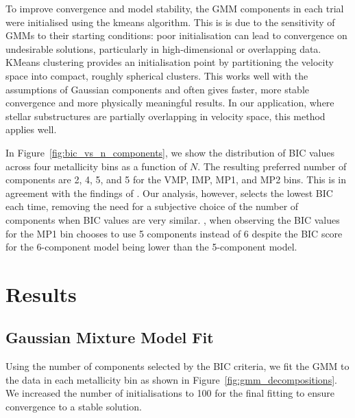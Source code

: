 \documentclass[a4paper,12pt]{article}
\begin{document}
To improve convergence and model stability, the GMM components in each trial were initialised using the kmeans algorithm. 
This is is due to the sensitivity of GMMs to their starting conditions: poor initialisation can lead to convergence 
on undesirable solutions, particularly in high-dimensional or overlapping data. KMeans clustering provides an
initialisation point by partitioning the velocity space into compact, roughly spherical clusters. This works well with the 
assumptions of Gaussian components and often gives faster, more stable convergence and more physically meaningful results. 
In our application, where stellar substructures are partially overlapping in velocity space, this method applies well.

In Figure~\ref{fig:bic_vs_n_components}, we show the distribution of BIC values across four metallicity bins as
a function of $N$. The resulting preferred number of components are 2, 4, 5, and 5 for the VMP, IMP, MP1, and MP2 bins.
This is in agreement with the findings of \citet{zhang2024existencemetalpoordiscmilky}.
Our analysis, however, selects the lowest BIC each time, removing the need for a subjective choice of the number of components
when BIC values are very similar. \citet{zhang2024existencemetalpoordiscmilky}, when observing the BIC values for the MP1 bin 
chooses to use 5 components instead of 6 despite the BIC score for the 6-component model being lower than the 5-component model.

 
\section{Results}
\label{sec:results1}

\subsection{Gaussian Mixture Model Fit}
\label{subsec:gmm}

Using the number of components selected by the BIC criteria, we fit the GMM to the data in each metallicity bin as shown in 
Figure~\ref{fig:gmm_decompositions}. We increased the number of initialisations to 100 for the final fitting to ensure convergence to a
stable solution.
\end{document}
